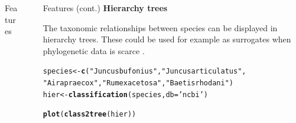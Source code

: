 \documentclass[final,t]{beamer}\usepackage[]{graphicx}\usepackage[]{color}
\makeatletter
\newcommand{\hlstr}[1]{\textcolor[rgb]{0.192,0.494,0.8}{#1}}%
\newcommand{\hlstd}[1]{\textcolor[rgb]{0.345,0.345,0.345}{#1}}%
\newcommand{\hlkwb}[1]{\textcolor[rgb]{0.69,0.353,0.396}{#1}}%
\newcommand{\hlkwc}[1]{\textcolor[rgb]{0.333,0.667,0.333}{#1}}%
\newcommand{\hlkwd}[1]{\textcolor[rgb]{0.737,0.353,0.396}{\textbf{#1}}}%
\newenvironment{kframe}{%
 \def\at@end@of@kframe{}%
 \ifinner\ifhmode%
  \def\at@end@of@kframe{\end{minipage}}%
  \begin{minipage}{\columnwidth}%
 \fi\fi%
 \def\FrameCommand##1{\hskip\@totalleftmargin \hskip-\fboxsep
 \colorbox{shadecolor}{##1}\hskip-\fboxsep
     \hskip-\linewidth \hskip-\@totalleftmargin \hskip\columnwidth}%
 \MakeFramed {\advance\hsize-\width
   \@totalleftmargin\z@ \linewidth\hsize
   \@setminipage}}%
 {\par\unskip\endMakeFramed%
 \at@end@of@kframe}
\newenvironment{knitrout}{}{} %
\renewenvironment{knitrout}{}{\vspace{-1.8em}}
\makeatother
\begin{document}
\begin{frame}[fragile]
\begin{columns}[t]
\begin{column}{.485\linewidth}
\begin{block}{Features}
			\end{block}
		\end{column}
    
		\begin{column}{0.01\linewidth}
		\end{column}



		\begin{column}{.485\linewidth}
			\vspace{-\baselineskip}
      
      \begin{block}{Features (cont.)}
\textcolor{i6bluedark}{\textbf{\large Hierarchy trees}} 
        \vspace{0.5em}
        \par
        \begingroup
        \leftskip=2cm
        \noindent 
          The taxonomic relationships between species can be displayed in hierarchy trees. 
          These could be used for example as surrogates when phylogenetic data is scarce \cite{guenard_using_2011}.
        \par
        \endgroup
\begin{knitrout}\footnotesize
{}\color{fgcolor}\begin{kframe}
\begin{alltt}
\hlstd{species} \hlkwb{<-} \hlkwd{c}\hlstd{(}\hlstr{"Juncus bufonius"}\hlstd{,} \hlstr{"Juncus articulatus"}\hlstd{,}
    \hlstr{"Aira praecox"}\hlstd{,} \hlstr{"Rumex acetosa"}\hlstd{,} \hlstr{"Baetis rhodani"}\hlstd{)}
\hlstd{hier} \hlkwb{<-} \hlkwd{classification}\hlstd{(species,} \hlkwc{db} \hlstd{=} \hlstr{'ncbi'}\hlstd{)}
\end{alltt}
\end{kframe}
\end{knitrout}

\begin{knitrout}\footnotesize
{}\color{fgcolor}\begin{kframe}
\begin{alltt}
\hlkwd{plot}\hlstd{(}\hlkwd{class2tree}\hlstd{(hier))}
\end{alltt}
\end{kframe}
\end{knitrout}
\vspace{2em}

\begin{knitrout}\footnotesize
{}\color{fgcolor}


\end{knitrout}
\end{block}
\end{column}
\end{columns}
\end{frame}
\end{document}
